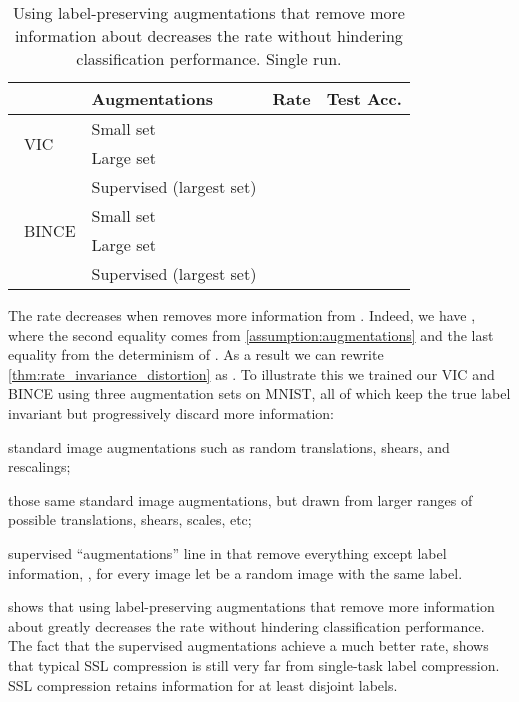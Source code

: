\documentclass[final]{article}
\begin{document}
\begin{table}[h]
\caption{
Using label-preserving augmentations that remove more information about  decreases the rate without hindering classification performance.
Single run.
}
\small
\center
\begin{tabular}{llrr}
\toprule
&Augmentations& Rate  & Test Acc.   \\ 
\midrule 
\multirow{2}{*}{\centering  ~VIC } 
 & Small set  &    &    \\ 
  & Large set  &    &    \\ 
   & Supervised (largest set)  &    &    \\ 
\midrule 
\multirow{2}{*}{\centering  ~BINCE  }
 & Small set  &    &    \\ 
  & Large set  &    &    \\ 
   & Supervised (largest set)  &    &    \\ 
\bottomrule
\end{tabular}
\label{table:mnist_augmentations}
\end{table} 

The rate decreases when  removes more information from .
Indeed, we have , where the second equality comes from \cref{assumption:augmentations} and the last equality from the determinism of .
As a result we can rewrite \cref{thm:rate_invariance_distortion} as .
To illustrate this we trained our VIC and BINCE using three augmentation sets on MNIST, all of which keep the true label invariant but progressively discard more  information:
\begin{inlinelist}
\item standard image augmentations such as random translations, shears, and rescalings;
\item those same standard image augmentations, but drawn from larger ranges of possible translations, shears, scales, etc;
\item supervised ``augmentations'' line in \cite{khosla_supervised_2020} that remove everything except label information, \ie, for every image   let  be a random image with the same label.
\end{inlinelist}
 shows that using label-preserving augmentations that remove more information about  greatly decreases the rate without hindering classification performance.
The fact that the supervised augmentations achieve a much better rate, shows that typical SSL compression is still very far from single-task label compression.
SSL compression retains information for at least  disjoint labels.
\end{document}
